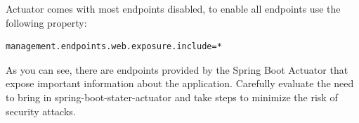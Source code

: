 Actuator comes with most endpoints disabled, to enable all endpoints use the following property:

\begin{verbatim}
management.endpoints.web.exposure.include=*
\end{verbatim}

As you can see, there are endpoints provided by the Spring Boot Actuator that expose important information about the application. Carefully evaluate the need to bring in spring-boot-stater-actuator and take steps to minimize the risk of security attacks.






